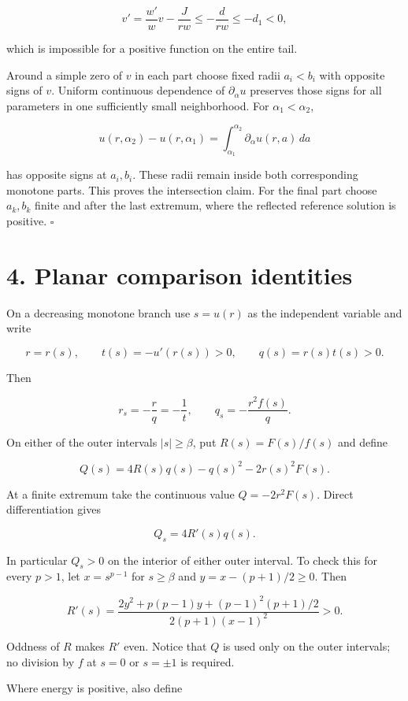 \documentclass[11pt]{article}
\begin{document}
\[v'=\frac{w'}w v-\frac{J}{rw}\leq-\frac d{rw}\leq-d_1<0,\]

which is impossible for a positive function on the entire tail.

Around a simple zero of \(v\) in each part choose fixed radii
\(a_i<b_i\) with opposite signs of \(v\). Uniform continuous dependence
of \(\partial_\alpha u\) preserves those signs for all parameters in one
sufficiently small neighborhood. For \(\alpha_1<\alpha_2\),

\[u(r,\alpha_2)-u(r,\alpha_1)=\int_{\alpha_1}^{\alpha_2}\partial_\alpha u(r,a)\,da\]

has opposite signs at \(a_i,b_i\). These radii remain inside both
corresponding monotone parts. This proves the intersection claim. For
the final part choose \(a_k,b_k\) finite and after the last extremum,
where the reflected reference solution is positive. \(\square\)

\section{4. Planar comparison
identities}\label{planar-comparison-identities}

On a decreasing monotone branch use \(s=u(r)\) as the independent
variable and write

\[r=r(s),\qquad t(s)=-u'(r(s))>0,\qquad q(s)=r(s)t(s)>0.\]

Then

\[r_s=-\frac rq=-\frac1t,\qquad q_s=-\frac{r^2f(s)}q. \tag{4.1}\]

On either of the outer intervals \(|s|\geq\beta\), put
\(R(s)=F(s)/f(s)\) and define

\[Q(s)=4R(s)q(s)-q(s)^2-2r(s)^2F(s). \tag{4.2}\]

At a finite extremum take the continuous value \(Q=-2r^2F(s)\). Direct
differentiation gives

\[Q_s=4R'(s)q(s). \tag{4.3}\]

In particular \(Q_s>0\) on the interior of either outer interval. To
check this for every \(p>1\), let \(x=s^{p-1}\) for \(s\geq\beta\) and
\(y=x-(p+1)/2\geq0\). Then

\[R'(s)=\frac{2y^2+p(p-1)y+(p-1)^2(p+1)/2}{2(p+1)(x-1)^2}>0. \tag{4.4}\]

Oddness of \(R\) makes \(R'\) even. Notice that \(Q\) is used only on
the outer intervals; no division by \(f\) at \(s=0\) or \(s=\pm1\) is
required.

Where energy is positive, also define
\end{document}
